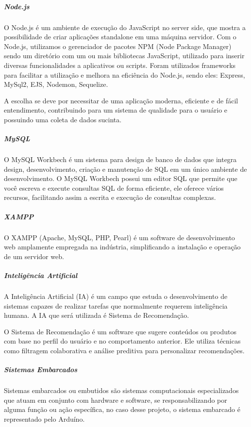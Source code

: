 \subparagraph*{\textbf{Node.js}}

O Node.js é um ambiente de execução do JavaScript no server side, que mostra a possibilidade de criar aplicações standalone em uma máquina servidor. Com o Node.js, utilizamos o gerenciador de pacotes NPM (Node Package Manager) sendo um diretório com um ou mais bibliotecas JavaScript, utilizado para inserir diversas funcionalidades a aplicativos ou scripts\cite{alura2023}.   Foram utilizados frameworks para facilitar a utilização e melhora na eficiência do Node.js, sendo eles: Express, MySql2, EJS, Nodemon, Sequelize.

A escolha se deve por necessitar de uma aplicação moderna, eficiente e de fácil entendimento, contribuindo para um sistema de qualidade para o usuário e possuindo uma coleta de dados sucinta.

\subparagraph*{\textbf{MySQL}}
  
O MySQL Workbech é um sistema para design de banco de dados que integra design, desenvolvimento, criação e manutenção de SQL em um único ambiente de desenvolvimento. O MySQL Workbech possui um editor SQL que permite que você escreva e execute consultas SQL de forma eficiente, ele oferece vários recursos, facilitando assim a escrita e execução de consultas complexas\cite{andrade2020}. 

\subparagraph*{\textbf{XAMPP}}

O XAMPP (Apache, MySQL, PHP, Pearl) é um software de desenvolvimento web amplamente empregada na indústria, simplificando a instalação e operação de um servidor web\cite{methaseo2023}.

\subparagraph*{\textbf{Inteligência Artificial}}

A Inteligência Artificial (IA) é um campo que estuda o desenvolvimento de sistemas capazes de realizar tarefas que normalmente requerem inteligência humana. A IA que será utilizada é Sistema de Recomendação.

O Sistema de Recomendação é um software que sugere conteúdos ou produtos com base no perfil do usuário e no comportamento anterior. Ele utiliza técnicas como filtragem colaborativa e análise preditiva para personalizar recomendações\cite{mensagem2023}.

\subparagraph*{\textbf{Sistemas Embarcados}}
 
Sistemas embarcados ou embutidos são sistemas computacionais especializados que atuam em conjunto com hardware e software, se responsabilizando por alguma função ou ação específica, no caso desse projeto, o sistema embarcado é representado pelo Arduíno\cite{souza2022}. 

